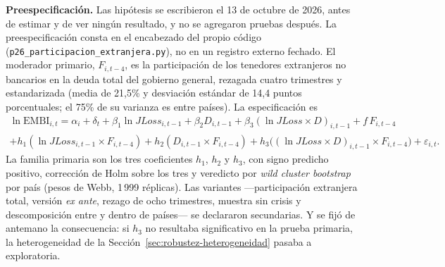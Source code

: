\textbf{Preespecificación.} Las hipótesis se escribieron el 13 de octubre de 2026, antes de estimar y de ver ningún resultado, y no se agregaron pruebas después. La preespecificación consta en el encabezado del propio código (\texttt{p26\_participacion\_extranjera.py}), no en un registro externo fechado. El moderador primario, $F_{i,t-4}$, es la participación de los tenedores extranjeros no bancarios en la deuda total del gobierno general, rezagada cuatro trimestres y estandarizada (media de 21,5\% y desviación estándar de 14,4 puntos porcentuales; el 75\% de su varianza es entre países). La especificación es
\begin{multline}
\ln\mathrm{EMBI}_{i,t}=\alpha_i+\delta_t+\beta_1\ln JLoss_{i,t-1}+\beta_2D_{i,t-1}+\beta_3(\ln JLoss\times D)_{i,t-1}+f\,F_{i,t-4}\\
+h_1(\ln JLoss_{i,t-1}\times F_{i,t-4})+h_2(D_{i,t-1}\times F_{i,t-4})+h_3\big((\ln JLoss\times D)_{i,t-1}\times F_{i,t-4}\big)+\varepsilon_{i,t}.
\label{eq:participacion}
\end{multline}
La familia primaria son los tres coeficientes $h_1$, $h_2$ y $h_3$, con signo predicho positivo, corrección de Holm sobre los tres y veredicto por \textit{wild cluster bootstrap} por país (pesos de Webb, 1\,999 réplicas). Las variantes ---participación extranjera total, versión \textit{ex ante}, rezago de ocho trimestres, muestra sin crisis y descomposición entre y dentro de países--- se declararon secundarias. Y se fijó de antemano la consecuencia: si $h_3$ no resultaba significativo en la prueba primaria, la heterogeneidad de la Sección~\ref{sec:robustez-heterogeneidad} pasaba a exploratoria.

